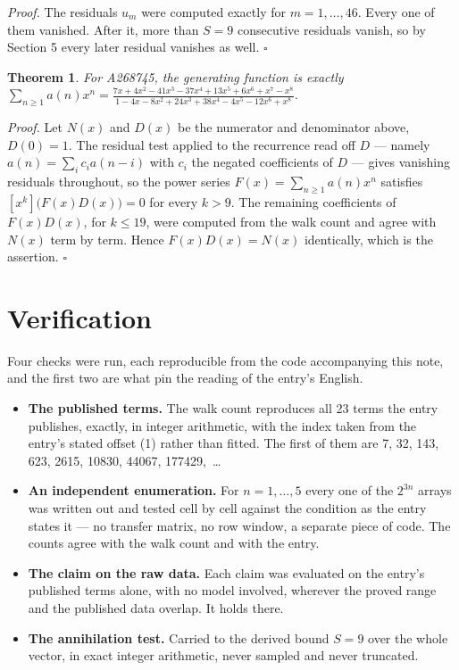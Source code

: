 \documentclass[11pt]{article}
\newtheorem{theorem}{Theorem}
\theoremstyle{definition}
\begin{document}
{\itshape Proof.} The residuals $u_m$ were computed exactly for $m = 1,\dots,46$. Every one of them vanished. After it, more than $S = 9$ consecutive residuals vanish, so by Section 5 every later residual vanishes as well. $\square$

\begin{theorem} For A268745, the generating function is exactly $\sum_{n\ge 1} a(n)x^n = \frac{7x + 4x^{2} - 41x^{3} - 37x^{4} + 13x^{5} + 6x^{6} + x^{7} - x^{8}}{1 - 4x - 8x^{2} + 24x^{3} + 38x^{4} - 4x^{5} - 12x^{6} + x^{8}}$.\end{theorem}

{\itshape Proof.} Let $N(x)$ and $D(x)$ be the numerator and denominator above, $D(0)=1$. The residual test applied to the recurrence read off $D$ --- namely $a(n) = \sum_i c_i a(n-i)$ with $c_i$ the negated coefficients of $D$ --- gives vanishing residuals throughout, so the power series $F(x)=\sum_{n\ge 1}a(n)x^n$ satisfies $[x^k]\bigl(F(x)D(x)\bigr) = 0$ for every $k > 9$. The remaining coefficients of $F(x)D(x)$, for $k \le 19$, were computed from the walk count and agree with $N(x)$ term by term. Hence $F(x)D(x) = N(x)$ identically, which is the assertion. $\square$

\section{Verification}

Four checks were run, each reproducible from the code accompanying this note, and the first two are what pin the reading of the entry's English.

\begin{itemize}

\item {\bfseries The published terms.} The walk count reproduces all 23 terms the entry publishes, exactly, in integer arithmetic, with the index taken from the entry's stated offset (1) rather than fitted. The first of them are 7, 32, 143, 623, 2615, 10830, 44067, 177429,~\dots

\item {\bfseries An independent enumeration.} For $n = 1,\dots,5$ every one of the $2^{3n}$ arrays was written out and tested cell by cell against the condition as the entry states it --- no transfer matrix, no row window, a separate piece of code. The counts agree with the walk count and with the entry.

\item {\bfseries The claim on the raw data.} Each claim was evaluated on the entry's published terms alone, with no model involved, wherever the proved range and the published data overlap. It holds there.

\item {\bfseries The annihilation test.} Carried to the derived bound $S = 9$ over the whole vector, in exact integer arithmetic, never sampled and never truncated.

\end{itemize}
\end{document}
